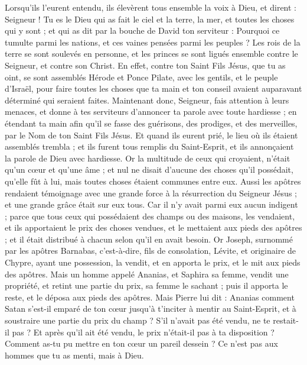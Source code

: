 \begin{multicols}{2}
Lorsqu’ils l’eurent entendu, ils élevèrent tous ensemble la voix à Dieu, et dirent : Seigneur ! Tu es le Dieu qui as fait le ciel et la terre, la mer, et toutes les choses qui y sont ;
et qui as dit par la bouche de David ton serviteur : Pourquoi ce tumulte parmi les nations, et ces vaines pensées parmi les peuples ?
Les rois de la terre se sont soulevés en personne, et les princes se sont ligués ensemble contre le Seigneur, et contre son Christ.
En effet, contre ton Saint Fils Jésus, que tu as oint, se sont assemblés Hérode et Ponce Pilate, avec les gentils, et le peuple d'Israël,
pour faire toutes les choses que ta main et ton conseil avaient auparavant déterminé qui seraient faites.
Maintenant donc, Seigneur, fais attention à leurs menaces, et donne à tes serviteurs d'annoncer ta parole avec toute hardiesse ;
en étendant ta main afin qu'il se fasse des guérisons, des prodiges, et des merveilles, par le Nom de ton Saint Fils Jésus.
Et quand ils eurent prié, le lieu où ils étaient assemblés trembla ; et ils furent tous remplis du Saint-Esprit, et ils annonçaient la parole de Dieu avec hardiesse.
Or la multitude de ceux qui croyaient, n'était qu'un cœur et qu'une âme ; et nul ne disait d'aucune des choses qu'il possédait, qu'elle fût à lui, mais toutes choses étaient communes entre eux.
Aussi les apôtres rendaient témoignage avec une grande force à la résurrection du Seigneur Jésus ; et une grande grâce était sur eux tous.
Car il n'y avait parmi eux aucun indigent ; parce que tous ceux qui possédaient des champs ou des maisons, les vendaient, et ils apportaient le prix des choses vendues,
et le mettaient aux pieds des apôtres ; et il était distribué à chacun selon qu'il en avait besoin.
Or Joseph, surnommé par les apôtres Barnabas, c'est-à-dire, fils de consolation, Lévite, et originaire de Chypre,
ayant une possession, la vendit, et en apporta le prix, et le mit aux pieds des apôtres.
\VerseOne{}Mais un homme appelé Ananias, et Saphira sa femme, vendit une propriété,
et retint une partie du prix, sa femme le sachant ; puis il apporta le reste, et le déposa aux pieds des apôtres.
Mais Pierre lui dit : Ananias comment Satan s'est-il emparé de ton cœur jusqu’à t'inciter à mentir au Saint-Esprit, et à soustraire une partie du prix du champ ?
S’il n’avait pas été vendu, ne te restait-il pas ? Et après qu’il ait été vendu, le prix n’était-il pas à ta disposition ? Comment as-tu pu mettre en ton cœur un pareil dessein ? Ce n’est pas aux hommes que tu as menti, mais à Dieu.

\end{multicols}
